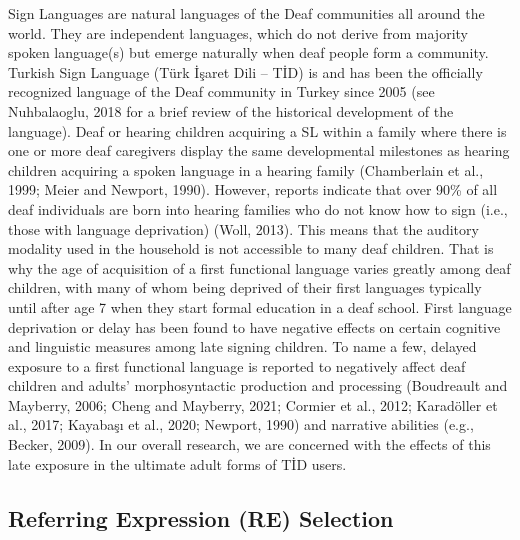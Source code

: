 \documentclass[]{elsarticle} %
\begin{document}
Sign Languages are natural languages of the Deaf communities all around
the world. They are independent languages, which do not derive from
majority spoken language(s) but emerge naturally when deaf people form a
community. Turkish Sign Language (Türk İşaret Dili -- TİD) is and has
been the officially recognized language of the Deaf community in Turkey
since 2005 (see Nuhbalaoglu, 2018 for a brief review of the historical
development of the language). Deaf or hearing children acquiring a SL
within a family where there is one or more deaf caregivers display the
same developmental milestones as hearing children acquiring a spoken
language in a hearing family (Chamberlain et al., 1999; Meier and
Newport, 1990). However, reports indicate that over 90\% of all deaf
individuals are born into hearing families who do not know how to sign
(i.e., those with language deprivation) (Woll, 2013). This means that
the auditory modality used in the household is not accessible to many
deaf children. That is why the age of acquisition of a first functional
language varies greatly among deaf children, with many of whom being
deprived of their first languages typically until after age 7 when they
start formal education in a deaf school. First language deprivation or
delay has been found to have negative effects on certain cognitive and
linguistic measures among late signing children. To name a few, delayed
exposure to a first functional language is reported to negatively affect
deaf children and adults' morphosyntactic production and processing
(Boudreault and Mayberry, 2006; Cheng and Mayberry, 2021; Cormier et
al., 2012; Karadöller et al., 2017; Kayabaşı et al., 2020; Newport,
1990) and narrative abilities (e.g., Becker, 2009). In our overall
research, we are concerned with the effects of this late exposure in the
ultimate adult forms of TİD users.

\hypertarget{referring-expression-re-selection}{%
\subsection{Referring Expression (RE)
Selection}\label{referring-expression-re-selection}}
\end{document}
